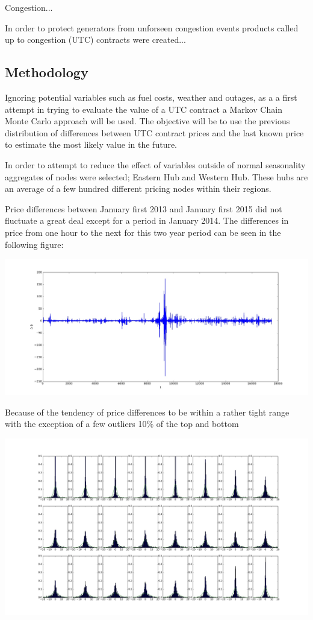 \documentclass{report}
\begin{document}
Congestion...

In order to protect generators from unforseen congestion events products called
up to congestion (UTC) contracts were created...

\subsection*{Methodology}
Ignoring potential variables such as fuel costs, weather and outages, as a a first
attempt in trying to evaluate the value of a UTC contract a Markov
Chain Monte Carlo approach will be used. The objective will be to use the
previous distribution of differences between UTC contract prices and the last
known price to estimate the most likely value in the future.

In order to attempt to reduce the effect of variables outside of normal seasonality
aggregates of nodes were selected; Eastern Hub and Western Hub. These hubs are an average
of a few hundred different pricing nodes within their regions.


Price differences between January first 2013 and January first 2015 did not
fluctuate a great deal except for a period in January 2014. The differences in
price from one hour to the next for this two year period can be seen in the
following figure:
\begin{center}
\includegraphics[width=500pt, keepaspectratio=true]{price_differences.jpg}\\
\end{center}
Because of the tendency of price differences to be within a rather tight range
with the exception of a few outliers  10\% of the top and bottom

\begin{center}
\includegraphics[width=500pt, keepaspectratio=true]{hourly_distributions.jpg}\\
\end{center}
\end{document}
